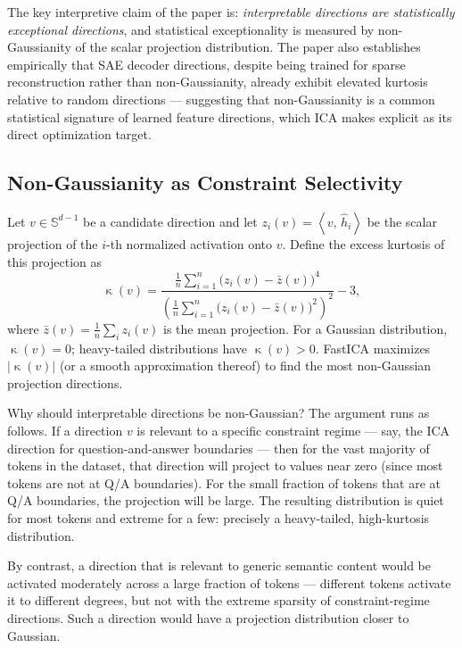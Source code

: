 \documentclass[12pt, a4paper]{article}
\theoremstyle{plain}
\theoremstyle{definition}
\theoremstyle{remark}
\newcommand{\Sph}{\mathbb{S}}
\newcommand{\ip}[2]{\left\langle #1,\, #2 \right\rangle}
\newcommand{\hh}{\hat{h}}
\DeclareMathOperator{\kur}{\kappa}
\begin{document}
The key interpretive claim of the paper is: \emph{interpretable directions are
statistically exceptional directions}, and statistical exceptionality is
measured by non-Gaussianity of the scalar projection distribution. The paper
also establishes empirically that SAE decoder directions, despite being trained
for sparse reconstruction rather than non-Gaussianity, already exhibit elevated
kurtosis relative to random directions --- suggesting that non-Gaussianity is a
common statistical signature of learned feature directions, which ICA makes
explicit as its direct optimization target.

\subsection{Non-Gaussianity as Constraint Selectivity}

Let $v \in \Sph^{d-1}$ be a candidate direction and let $z_i(v) = \ip{v}{\hh_i}$
be the scalar projection of the $i$-th normalized activation onto $v$. Define
the excess kurtosis of this projection as
\begin{equation}
  \kur(v) =
  \frac{\frac{1}{n}\sum_{i=1}^n \bigl(z_i(v) - \bar{z}(v)\bigr)^4}
  {\left(\frac{1}{n}\sum_{i=1}^n \bigl(z_i(v) - \bar{z}(v)\bigr)^2\right)^2}
  - 3,
\end{equation}
where $\bar{z}(v) = \frac{1}{n}\sum_i z_i(v)$ is the mean projection. For a
Gaussian distribution, $\kur(v) = 0$; heavy-tailed distributions have
$\kur(v) > 0$. FastICA maximizes $|\kur(v)|$ (or a smooth approximation thereof)
to find the most non-Gaussian projection directions.

Why should interpretable directions be non-Gaussian? The argument runs as
follows. If a direction $v$ is relevant to a specific constraint regime ---
say, the ICA direction for question-and-answer boundaries --- then for the vast
majority of tokens in the dataset, that direction will project to values near
zero (since most tokens are not at Q/A boundaries). For the small fraction of
tokens that are at Q/A boundaries, the projection will be large. The resulting
distribution is quiet for most tokens and extreme for a few: precisely a
heavy-tailed, high-kurtosis distribution.

By contrast, a direction that is relevant to generic semantic content would
be activated moderately across a large fraction of tokens --- different tokens
activate it to different degrees, but not with the extreme sparsity of
constraint-regime directions. Such a direction would have a projection
distribution closer to Gaussian.
\end{document}
